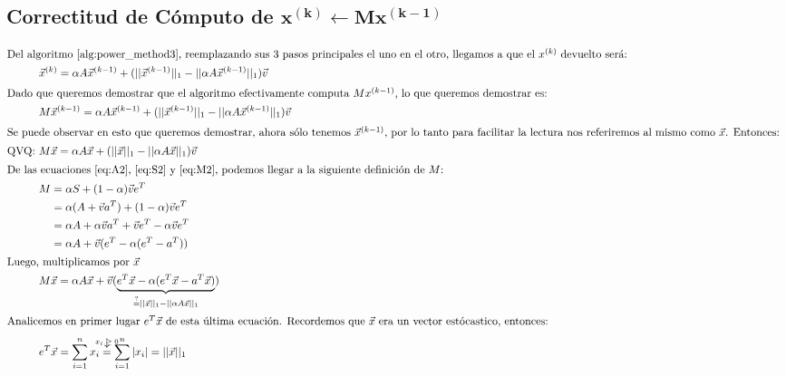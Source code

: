 \subsection{Correctitud de C\'omputo de $\mathbf{x^{(k)}\gets Mx^{(k-1)}}$}
\begin{align}
    \intertext{Del algoritmo \ref{alg:power_method3}, reemplazando sus 3 pasos
        principales el uno en el otro, llegamos a que el $x^{(k)}$ devuelto
        ser\'a:}
    &\vec{x}^{(k)} = \alpha A \vec{x}^{(k-1)} + (||\vec{x}^{(k-1)}||_1 - ||\alpha
        A\vec{x}^{(k-1)}||_1)\vec{v}\\
    \intertext{Dado que queremos demostrar que el algoritmo efectivamente
        computa $Mx^{(k-1)}$, lo que queremos demostrar es:}
    &M\vec{x}^{(k-1)} = \alpha A \vec{x}^{(k-1)} + (||\vec{x}^{(k-1)}||_1 -
    ||\alpha A\vec{x}^{(k-1)}||_1)\vec{v}\\
    \intertext{Se puede observar en esto que queremos demostrar, ahora
    s\'olo tenemos $\vec{x}^{(k-1)}$, por lo tanto para facilitar la lectura nos
    referiremos al mismo como $\vec{x}$. Entonces: }
    \text{QVQ: }& M\vec{x} = \alpha A \vec{x} + (||\vec{x}||_1 - ||\alpha
    A\vec{x}||_1)\vec{v}\label{eq:qvq_dem}\\
    \intertext{De las ecuaciones \ref{eq:A2}, \ref{eq:S2} y \ref{eq:M2}, podemos
    llegar a la siguiente definici\'on de $M$:}
    &\begin{aligned}
        M &= \alpha S + (1-\alpha)\vec{v}e^T\\
          &= \alpha(A+\vec{v}a^T)+(1-\alpha)\vec{v}e^T\\
          &= \alpha A+\alpha\vec{v}a^T+\vec{v}e^T-\alpha\vec{v}e^T\\
          &= \alpha A+\vec{v}(e^T-\alpha(e^T-a^T))
    \end{aligned}\\
    \intertext{Luego, multiplicamos por $\vec{x}$}
    &M\vec{x} = \alpha
        A\vec{x} + \vec{v}(\underbrace{e^T\vec{x} - \alpha(e^T\vec{x} -
        a^T\vec{x})}_{\overset{?}{=} ||\vec{x}||_1 - ||\alpha
        A\vec{x}||_1})\label{eq:Mx}\\
    \intertext{Analicemos en primer lugar $e^T\vec{x}$ de esta \'ultima
    ecuaci\'on. Recordemos que $\vec{x}$ era un vector est\'ocastico, entonces:}
    & e^T\vec{x} = \sum_{i=1}^{n}x_i\overarrow[=][\downarrow]{$x_i\geq 0$}
    \sum_{i=1}^{n}|x_i| = ||\vec{x}||_1\label{eq:reemp1}\\

\end{align}
